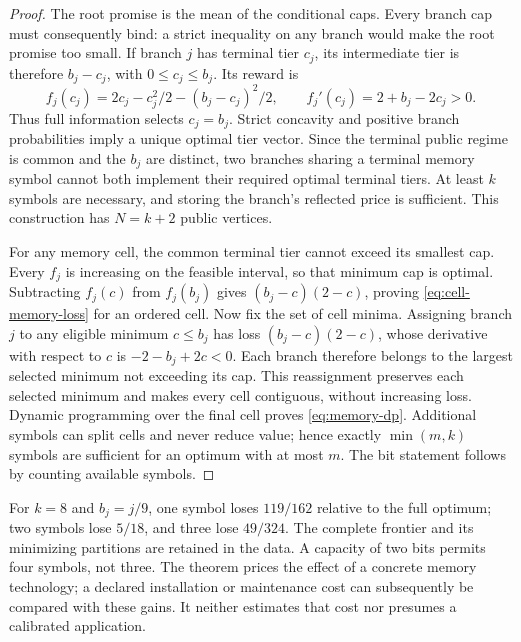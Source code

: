 \begin{proof}
The root promise is the mean of the conditional caps. Every branch cap must consequently bind: a strict inequality on any branch would make the root promise too small. If branch $j$ has terminal tier $c_j$, its intermediate tier is therefore $b_j-c_j$, with $0\leq c_j\leq b_j$. Its reward is
\[
 f_j(c_j)=2c_j-c_j^2/2-(b_j-c_j)^2/2,
 \qquad f_j'(c_j)=2+b_j-2c_j>0.
\]
Thus full information selects $c_j=b_j$. Strict concavity and positive branch probabilities imply a unique optimal tier vector. Since the terminal public regime is common and the $b_j$ are distinct, two branches sharing a terminal memory symbol cannot both implement their required optimal terminal tiers. At least $k$ symbols are necessary, and storing the branch's reflected price is sufficient. This construction has $N=k+2$ public vertices.

For any memory cell, the common terminal tier cannot exceed its smallest cap. Every $f_j$ is increasing on the feasible interval, so that minimum cap is optimal. Subtracting $f_j(c)$ from $f_j(b_j)$ gives $(b_j-c)(2-c)$, proving \eqref{eq:cell-memory-loss} for an ordered cell. Now fix the set of cell minima. Assigning branch $j$ to any eligible minimum $c\leq b_j$ has loss $(b_j-c)(2-c)$, whose derivative with respect to $c$ is $-2-b_j+2c<0$. Each branch therefore belongs to the largest selected minimum not exceeding its cap. This reassignment preserves each selected minimum and makes every cell contiguous, without increasing loss. Dynamic programming over the final cell proves \eqref{eq:memory-dp}. Additional symbols can split cells and never reduce value; hence exactly $\min(m,k)$ symbols are sufficient for an optimum with at most $m$. The bit statement follows by counting available symbols.
\end{proof}

For $k=8$ and $b_j=j/9$, one symbol loses $119/162$ relative to the full optimum; two symbols lose $5/18$, and three lose $49/324$. The complete frontier and its minimizing partitions are retained in the data. A capacity of two bits permits four symbols, not three. The theorem prices the effect of a concrete memory technology; a declared installation or maintenance cost can subsequently be compared with these gains. It neither estimates that cost nor presumes a calibrated application.
